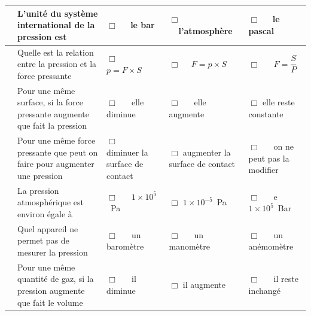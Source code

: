 \documentclass[11pt,a4paper]{article}
\begin{document}
\begin{center}



    \begin{tabular}{|C{0.5cm} p{5.5cm}|C{3cm}|C{3cm}|C{3cm}|}
         \hline
        &L'unité du système international de la pression est & $\Box $ ~~le bar& $\Box $ ~~l'atmosphère & $\Box $ ~~le pascal\\
         \hline
      &Quelle est la relation entre la pression et la force pressante  & $\Box $ ~~$p=F \times S$ & $\Box $ ~~$F=p \times S$  & $\Box $ ~~ $F=\dfrac{S}{P}$ \\
         \hline
          &Pour une même surface, si la force pressante augmente  que fait la pression &$\Box $ ~~ elle diminue& $\Box $ ~~ elle augmente & $\Box $ elle reste constante  \\
         \hline
          &Pour une même force pressante que peut on faire pour augmenter une pression & $\Box $ ~~ diminuer la surface de contact& $\Box $ augmenter la surface de contact& $\Box $ ~~ on ne peut pas la modifier\\
         \hline
         & La pression atmosphérique est environ égale à  &$\Box $ ~~ $1\times 10^5$~Pa& $\Box $ $1\times 10^{-5} $~Pa& $\Box $ ~~ e$1\times 10^5$~Bar \\
         \hline
         &Quel appareil ne permet pas de mesurer la pression & $\Box $ ~~ un baromètre & $\Box $ ~~  un manomètre & $\Box $ ~~  un anémomètre \\
         \hline
          &Pour une même quantité de gaz, si la pression augmente que fait le volume&$\Box$ ~~ il diminue& $\Box$ il augmente &$\Box$ ~~ il reste inchangé\\
         \hline

         
        
    \end{tabular}
\end{center}
\end{document}
